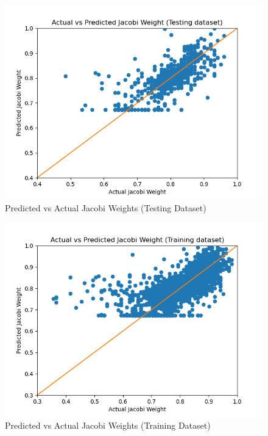 \begin{figure}[h]
  \centering
  \includegraphics[scale=0.7]{figures/jacobi-test.png}
  \caption{Predicted vs Actual Jacobi Weights (Testing Dataset)}
  \label{fig:test}
\end{figure}

\begin{figure}[h]
  \centering
  \includegraphics[scale=0.7]{figures/jacobi-train.png}
  \caption{Predicted vs Actual Jacobi Weights (Training Dataset)}
  \label{fig:train}
\end{figure}


